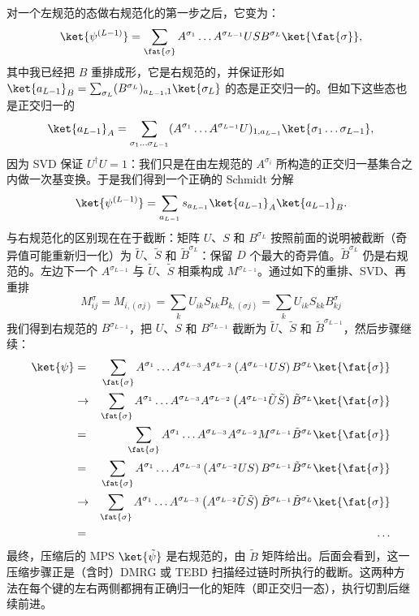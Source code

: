 对一个左规范的态做右规范化的第一步之后，它变为：
\begin{equation}
\ket{\psi^{(L-1)}} = \sum_{\fat{\sigma}} A^{\sigma_1} \ldots A^{\sigma_{L-1}} U S B^{\sigma_L} \ket{\fat{\sigma}} ,
\end{equation}
其中我已经把 $B$ 重排成形，它是右规范的，并保证形如 $\ket{a_{L-1}}_B = \sum_{\sigma_L} (B^{\sigma_L})_{a_{L-1},1} \ket{\sigma_L}$ 的态是正交归一的。但如下这些态也是正交归一的
\begin{equation}
\ket{a_{L-1}}_A = \sum_{\sigma_1 \ldots \sigma_{L-1}} (A^{\sigma_1} \ldots A^{\sigma_{L-1}} U)_{1,a_{L-1}} \ket{\sigma_1 \ldots \sigma_{L-1}},
\end{equation}
因为 SVD 保证 $U^\dagger U = 1$：我们只是在由左规范的 $A^{\sigma_i}$ 所构造的正交归一基集合之内做一次基变换。于是我们得到一个正确的 Schmidt 分解
\begin{equation}
\ket{\psi^{(L-1)}} = \sum_{a_{L-1}} s_{a_{L-1}} \ket{a_{L-1}}_A \ket{a_{L-1}}_B .
\end{equation}
与右规范化的区别现在在于截断：矩阵 $U$、$S$ 和 $B^{\sigma_L}$ 按照前面的说明被截断（奇异值可能重新归一化）为 $\tilde{U}$、$\tilde{S}$ 和 $\tilde{B}^{\sigma_L}$：保留 $D$ 个最大的奇异值。$\tilde{B}^{\sigma_L}$ 仍是右规范的。左边下一个 $A^{\sigma_{L-1}}$ 与 $\tilde{U}$、$\tilde{S}$ 相乘构成 $M^{\sigma_{L-1}}$。通过如下的重排、SVD、再重排
\begin{equation}
M^{\sigma}_{ij} = M_{i, (\sigma j)} = \sum_k U_{ik} S_{kk} B_{k,(\sigma j)} = \sum_k U_{ik} S_{kk} B^{\sigma}_{kj} 
\end{equation} 
我们得到右规范的 $B^{\sigma_{L-1}}$，把 $U$、$S$ 和 $B^{\sigma_{L-1}}$ 截断为 $\tilde{U}$、$\tilde{S}$ 和 $\tilde{B}^{\sigma_{L-1}}$，然后步骤继续：
\begin{eqnarray*}
\ket{\psi} &=& \sum_{\fat{\sigma}}  A^{\sigma_1} \ldots A^{\sigma_{L-3}}A^{\sigma_{L-2}} \left( A^{\sigma_{L-1}} U S \right)B^{\sigma_L}   \ket{\fat{\sigma}} \\
&\rightarrow& \sum_{\fat{\sigma}} A^{\sigma_1} \ldots A^{\sigma_{L-3}}A^{\sigma_{L-2}}\left( A^{\sigma_{L-1}} \tilde{U} \tilde{S} \right) \tilde{B}^{\sigma_L}   \ket{\fat{\sigma}} \\
&=&  \sum_{\fat{\sigma}} A^{\sigma_1} \ldots A^{\sigma_{L-3}}A^{\sigma_{L-2}} M^{\sigma_{L-1}} \tilde{B}^{\sigma_L}   \ket{\fat{\sigma}} \\
&=& \sum_{\fat{\sigma}} A^{\sigma_1} \ldots A^{\sigma_{L-3}} \left( A^{\sigma_{L-2}} U S \right) B^{\sigma_{L-1}} \tilde{B}^{\sigma_L}   \ket{\fat{\sigma}} \\
&\rightarrow& \sum_{\fat{\sigma}} A^{\sigma_1} \ldots A^{\sigma_{L-3}} \left( A^{\sigma_{L-2}} \tilde{U} \tilde{S} \right) \tilde{B}^{\sigma_{L-1}} \tilde{B}^{\sigma_L}   \ket{\fat{\sigma}} \\
&=& \ldots
\end{eqnarray*}
最终，压缩后的 MPS $\ket{\tilde{\psi}}$ 是右规范的，由 $\tilde{B}$ 矩阵给出。后面会看到，这一压缩步骤正是（含时）DMRG 或 TEBD 扫描经过链时所执行的截断。这两种方法在每个键的左右两侧都拥有正确归一化的矩阵（即正交归一态），执行切割后继续前进。

